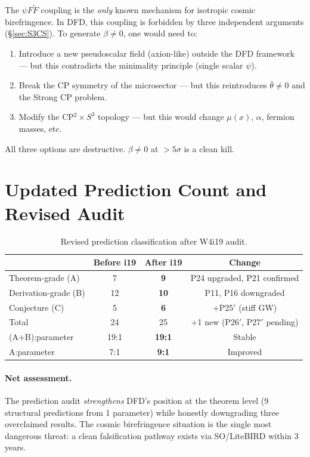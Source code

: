 \documentclass[11pt]{article}
\begin{document}
The $\psi F\tilde{F}$ coupling is the \emph{only} known mechanism
for isotropic cosmic birefringence.  In DFD, this coupling is
forbidden by three independent arguments (\S\ref{sec:S3CS}).
To generate $\beta \neq 0$, one would need to:
\begin{enumerate}
\item Introduce a new pseudoscalar field (axion-like) outside
  the DFD framework --- but this contradicts the minimality
  principle (single scalar $\psi$).
\item Break the CP symmetry of the microsector --- but this
  reintroduces $\bar{\theta} \neq 0$ and the Strong CP problem.
\item Modify the CP$^2 \times S^3$ topology --- but this
  would change $\mu(x)$, $\alpha$, fermion masses, etc.
\end{enumerate}

All three options are destructive.  $\beta \neq 0$ at $> 5\sigma$
is a clean kill.


\section{Updated Prediction Count and Revised Audit}
\label{sec:revised}

\begin{table}[h]
\centering
\caption{Revised prediction classification after W4i19 audit.}
\begin{tabular}{lccc}
\toprule
& \textbf{Before i19} & \textbf{After i19} & \textbf{Change} \\
\midrule
Theorem-grade (A) & 7 & \textbf{9} & P24 upgraded, P21 confirmed \\
Derivation-grade (B) & 12 & \textbf{10} & P11, P16 downgraded \\
Conjecture (C) & 5 & \textbf{6} & +P25$'$ (stiff GW) \\
\midrule
Total & 24 & 25 & +1 new (P26$'$, P27$'$ pending) \\
\midrule
(A+B):parameter & 19:1 & \textbf{19:1} & Stable \\
A:parameter & 7:1 & \textbf{9:1} & Improved \\
\bottomrule
\end{tabular}
\end{table}

\paragraph{Net assessment.}
The prediction audit \emph{strengthens} DFD's position at the
theorem level (9 structural predictions from 1 parameter) while
honestly downgrading three overclaimed results.  The cosmic
birefringence situation is the single most dangerous threat:
a clean falsification pathway exists via SO/LiteBIRD within
3 years.
\end{document}
